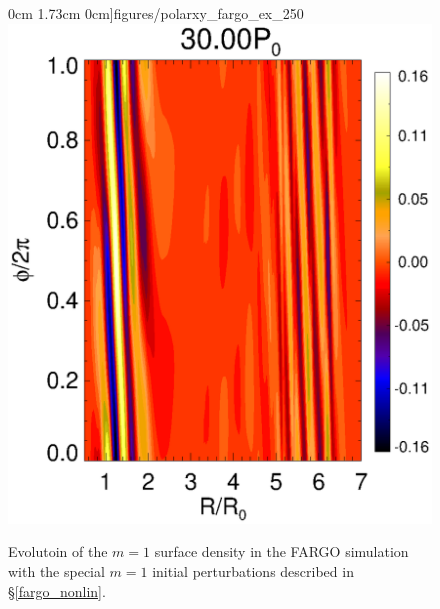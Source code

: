 \begin{figure}
  0cm 1.73cm 0cm]{figures/polarxy_fargo_ex_250}\includegraphics[scale=0.4,clip=true,trim=2.24cm
  0cm 0.0cm 0cm]{figures/polarxy_fargo_ex_300}
  \caption{Evolutoin of the $m=1$ surface density in the FARGO
    simulation with the special $m=1$ initial perturbations
    described in \S\ref{fargo_nonlin}. 
    \label{2d_angmom_ex_evol}} 
\end{figure}  
